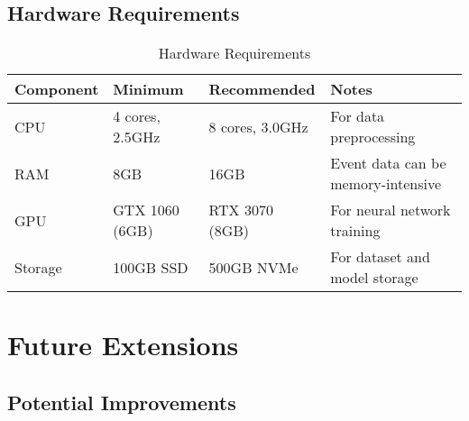 \documentclass[12pt,a4paper]{article}
\begin{document}
\subsection{Hardware Requirements}

\begin{table}[H]
\centering
\begin{tabular}{|l|l|l|l|}
\hline
\textbf{Component} & \textbf{Minimum} & \textbf{Recommended} & \textbf{Notes} \\
\hline
CPU & 4 cores, 2.5GHz & 8 cores, 3.0GHz & For data preprocessing \\
RAM & 8GB & 16GB & Event data can be memory-intensive \\
GPU & GTX 1060 (6GB) & RTX 3070 (8GB) & For neural network training \\
Storage & 100GB SSD & 500GB NVMe & For dataset and model storage \\
\hline
\end{tabular}
\caption{Hardware Requirements}
\end{table}

\section{Future Extensions}

\subsection{Potential Improvements}
\end{document}
